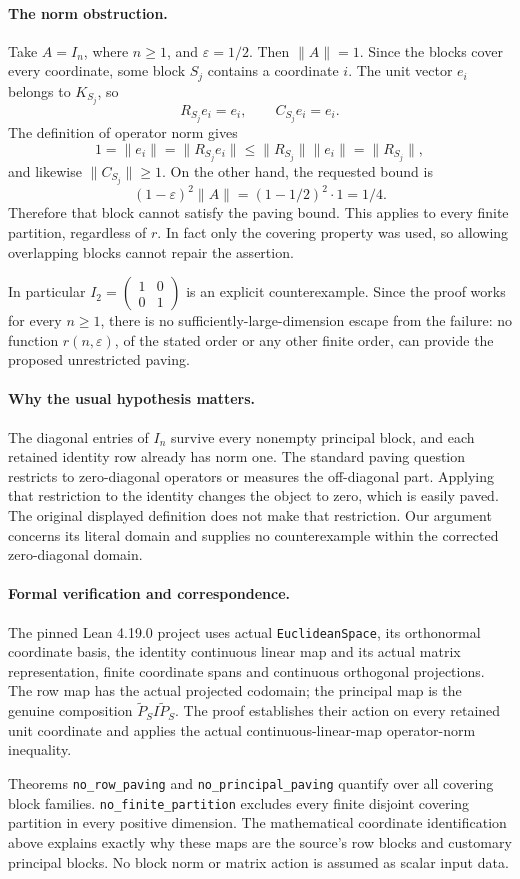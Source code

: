 \documentclass[11pt]{article}
\begin{document}
\newpage
\paragraph{The norm obstruction.}
Take $A=I_n$, where $n\ge1$, and $\varepsilon=1/2$. Then $\|A\|=1$. Since the blocks cover every coordinate, some block $S_j$ contains a coordinate $i$. The unit vector $e_i$ belongs to $K_{S_j}$, so
\[
R_{S_j}e_i=e_i,\qquad C_{S_j}e_i=e_i.
\]
The definition of operator norm gives
\[
1=\|e_i\|=\|R_{S_j}e_i\|
\le \|R_{S_j}\|\|e_i\|=\|R_{S_j}\|,
\]
and likewise $\|C_{S_j}\|\ge1$. On the other hand, the requested bound is
\[
(1-\varepsilon)^2\|A\|=(1-1/2)^2\cdot1=1/4.
\]
Therefore that block cannot satisfy the paving bound. This applies to every finite partition, regardless of $r$. In fact only the covering property was used, so allowing overlapping blocks cannot repair the assertion.

In particular $I_2=\left(\begin{smallmatrix}1&0\\0&1\end{smallmatrix}\right)$ is an explicit counterexample. Since the proof works for every $n\ge1$, there is no sufficiently-large-dimension escape from the failure: no function $r(n,\varepsilon)$, of the stated order or any other finite order, can provide the proposed unrestricted paving.

\paragraph{Why the usual hypothesis matters.}
The diagonal entries of $I_n$ survive every nonempty principal block, and each retained identity row already has norm one. The standard paving question restricts to zero-diagonal operators or measures the off-diagonal part. Applying that restriction to the identity changes the object to zero, which is easily paved. The original displayed definition does not make that restriction. Our argument concerns its literal domain and supplies no counterexample within the corrected zero-diagonal domain.

\paragraph{Formal verification and correspondence.}
The pinned Lean 4.19.0 project uses actual \texttt{EuclideanSpace}, its orthonormal coordinate basis, the identity continuous linear map and its actual matrix representation, finite coordinate spans and continuous orthogonal projections. The row map has the actual projected codomain; the principal map is the genuine composition $\widetilde P_S I\widetilde P_S$. The proof establishes their action on every retained unit coordinate and applies the actual continuous-linear-map operator-norm inequality.

Theorems \texttt{no\_row\_paving} and \texttt{no\_principal\_paving} quantify over all covering block families. \texttt{no\_finite\_partition} excludes every finite disjoint covering partition in every positive dimension. The mathematical coordinate identification above explains exactly why these maps are the source's row blocks and customary principal blocks. No block norm or matrix action is assumed as scalar input data.
\end{document}
